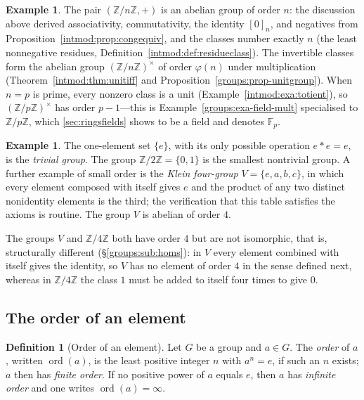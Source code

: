\documentclass[11pt,a4paper]{article}
\theoremstyle{definition}
\newtheorem{definition}[theorem]{Definition}
\newtheorem{example}[theorem]{Example}
\theoremstyle{remark}
\newcommand{\Z}{\ensuremath{\mathbb{Z}}}
\newcommand{\Fp}{\ensuremath{\mathbb{F}_{p}}}
\DeclareMathOperator{\ord}{ord}
\begin{document}
\begin{example}\label{groups:exa-Zn}
The pair \((\Z/n\Z, +)\) is an abelian group of order \(n\): the
discussion above derived associativity, commutativity, the identity
\([0]_n\), and negatives from
Proposition~\ref{intmod:prop:congequiv}, and the classes number
exactly \(n\) (the least nonnegative residues,
Definition~\ref{intmod:def:residueclass}). The invertible classes form the
abelian group \((\Z/n\Z)^\times\) of order \(\varphi(n)\) under
multiplication (Theorem~\ref{intmod:thm:unitiff} and
Proposition~\ref{groups:prop-unitgroup}). When
\(n = p\) is prime, every nonzero class is a unit
(Example~\ref{intmod:exa:totient}), so \((\Z/p\Z)^\times\) has order
\(p - 1\)---this is Example~\ref{groups:exa-field-mult} specialised to
\(\Z/p\Z\), which \cref{sec:ringsfields} shows to be a field and
denotes \(\Fp\).
\end{example}

\begin{example}\label{groups:exa-trivial}
The one-element set \(\{e\}\), with its only possible operation
\(e \ast e = e\), is the \emph{trivial group}. The group
\(\Z/2\Z = \{0,1\}\) is the smallest nontrivial group. A further example of
small order is the \emph{Klein four-group} \(V = \{e,a,b,c\}\), in which every
element composed with itself gives \(e\) and the product of any two
distinct nonidentity elements is the third; the verification that this
table satisfies the axioms is routine. The group \(V\) is abelian of order
\(4\).
\end{example}

The groups \(V\) and \(\Z/4\Z\) both have order \(4\) but are not
isomorphic, that is, structurally different (\S\ref{groups:sub:homs}): in
\(V\) every element combined with itself gives the identity, so \(V\) has no
element of order \(4\) in the sense defined next, whereas in \(\Z/4\Z\) the
class \(1\) must be added to itself four times to give \(0\).

\subsection{The order of an element}\label{groups:sub:order}

\begin{definition}[Order of an element]\label{groups:def-order-elt}
Let \(G\) be a group and \(a \in G\). The \emph{order} of \(a\), written
\(\ord(a)\), is the least positive integer \(n\) with \(a^n = e\), if such
an \(n\) exists; \(a\) then has \emph{finite order}. If no positive power
of \(a\) equals \(e\), then \(a\) has \emph{infinite order} and one writes
\(\ord(a) = \infty\).
\end{definition}
\end{document}
